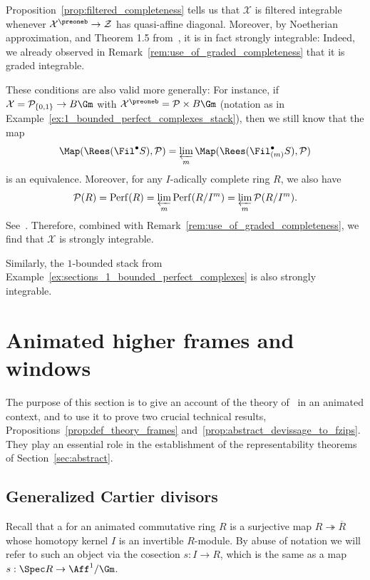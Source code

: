 \documentclass[10pt]{amsart}
\begin{document}
\begin{remark}
\label{rem:use_of_filtered_completeness}
Proposition~\ref{prop:filtered_completeness} tells us that $\mathcal{X}$ is filtered integrable whenever $\mathcal{X}^\preoneb\to \mathcal{Z}$ has quasi-affine diagonal. Moreover, by Noetherian approximation, and Theorem 1.5 from~\cite{BHATT2017576}, it is in fact strongly integrable: Indeed, we already observed in Remark~\ref{rem:use_of_graded_completeness} that it is graded integrable.

These conditions are also valid more generally: For instance, if $\mathcal{X}= \mathcal{P}_{\{0,1\}}\to B\Gm$ with $\mathcal{X}^\preoneb = \mathcal{P}\times B\Gm$ (notation as in Example~\ref{ex:1_bounded_perfect_complexes_stack}), then we still know that the map
\[
\Map(\Rees(\Fil^\bullet S),\mathcal{P}) = \varprojlim_m\Map(\Rees(\Fil^\bullet_{(m)}S),\mathcal{P}) 
\]
is an equivalence. Moreover, for any $I$-adically complete ring $R$, we also have
\[
\mathcal{P}(R) = \mathrm{Perf}(R) = \varprojlim_m \mathrm{Perf}(R/I^m) = \varprojlim_m \mathcal{P}(R/I^m).
\]
See~\cite[Lemma 8.2]{BHATT2017576}. Therefore, combined with Remark~\ref{rem:use_of_graded_completeness}, we find that $\mathcal{X}$ is strongly integrable.

Similarly, the $1$-bounded stack from Example~\ref{ex:sections_1_bounded_perfect_complexes} is also strongly integrable.
\end{remark} 




\section{Animated higher frames and windows}
\label{sec:higher_frames}

The purpose of this section is to give an account of the theory of~\cite{MR4355476} in an animated context, and to use it to prove two crucial technical results, Propositions~\ref{prop:def_theory_frames} and~\ref{prop:abstract_devissage_to_fzips}. They play an essential role in the establishment of the representability theorems of Section~\ref{sec:abstract}. 



\subsection{Generalized Cartier divisors}

\begin{definition}
Recall that a  for an animated commutative ring $R$ is a surjective map $R\twoheadrightarrow\overline{R}$ whose homotopy kernel $I$ is an invertible $R$-module. By abuse of notation we will refer to such an object via the cosection $s:I\to R$, which is the same as a map $s:\Spec R\to \Aff^1/\Gm$.
\end{definition}
\end{document}
